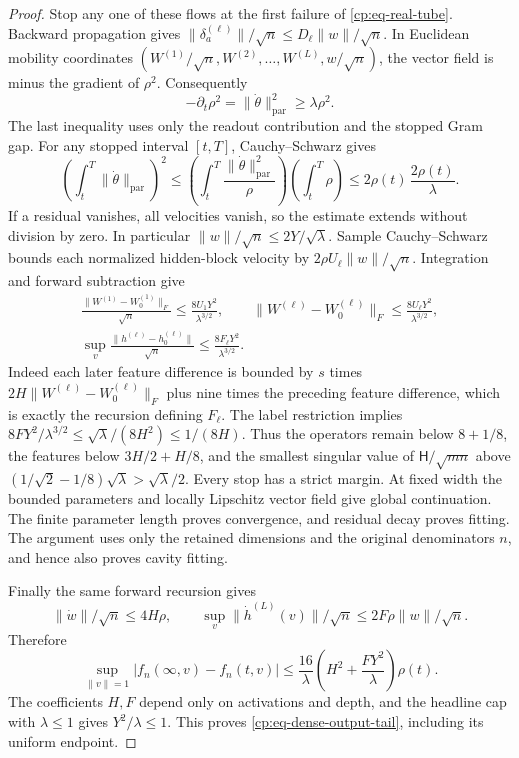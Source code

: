 \begin{proof}
Stop any one of these flows at the first failure of
\eqref{cp:eq-real-tube}.  Backward propagation gives
$\|\delta_a^{(\ell)}\|/\sqrt n\le D_\ell\|w\|/\sqrt n$.
In Euclidean mobility coordinates
$(W^{(1)}/\sqrt n,W^{(2)},\ldots,W^{(L)},w/\sqrt n)$,
the vector field is minus the gradient of $\rho^2$.  Consequently
\[
 -\partial_t\rho^2=\|\dot\theta\|_{\mathrm{par}}^2
 \ge\lambda\rho^2.
\]
The last inequality uses only the readout contribution and the stopped
Gram gap.  For any stopped interval $[t,T]$, Cauchy--Schwarz gives
\[
 \left(\int_t^T\|\dot\theta\|_{\mathrm{par}}\right)^2
 \le\left(\int_t^T\frac{\|\dot\theta\|_{\mathrm{par}}^2}{\rho}\right)
      \left(\int_t^T\rho\right)
 \le2\rho(t)\,\frac{2\rho(t)}\lambda.
\]
If a residual vanishes, all velocities vanish, so the estimate extends
without division by zero.  In particular $\|w\|/\sqrt n\le2Y/\sqrt\lambda$.
Sample Cauchy--Schwarz bounds each normalized hidden-block velocity by
$2\rho U_\ell\|w\|/\sqrt n$.  Integration and forward subtraction give
\begin{gather}
 \frac{\|W^{(1)}-W_0^{(1)}\|_F}{\sqrt n}
       \le\frac{8U_1Y^2}{\lambda^{3/2}},\qquad
 \|W^{(\ell)}-W_0^{(\ell)}\|_F
       \le\frac{8U_\ell Y^2}{\lambda^{3/2}},\nonumber\\
 \sup_v\frac{\|h^{(\ell)}-h_0^{(\ell)}\|}{\sqrt n}
       \le\frac{8F_\ell Y^2}{\lambda^{3/2}}.
 \label{cp:eq-dense-displacements}
\end{gather}
Indeed each later feature difference is bounded by $s$ times
$2H\|W^{(\ell)}-W_0^{(\ell)}\|_F$ plus nine times the preceding
feature difference, which is exactly the recursion defining $F_\ell$.
The label restriction implies
$8FY^2/\lambda^{3/2}\le\sqrt\lambda/(8H^2)\le1/(8H)$.
Thus the operators remain below $8+1/8$, the features below
$3H/2+H/8$, and the smallest singular value of
$\mathsf H/\sqrt{mn}$ above
$(1/\sqrt2-1/8)\sqrt\lambda>\sqrt\lambda/2$.
Every stop has a strict margin.  At fixed width the bounded parameters
and locally Lipschitz vector field give global continuation.  The
finite parameter length proves convergence, and residual decay proves
fitting.  The argument uses only the retained dimensions and the
original denominators $n$, and hence also proves cavity fitting.

Finally the same forward recursion gives
\[
 \|\dot w\|/\sqrt n\le4H\rho,\qquad
 \sup_v\|\dot h^{(L)}(v)\|/\sqrt n\le2F\rho\|w\|/\sqrt n.
\]
Therefore
\[
 \sup_{\|v\|=1}|f_n(\infty,v)-f_n(t,v)|
 \le\frac{16}{\lambda}
       \left(H^2+\frac{FY^2}{\lambda}\right)\rho(t).
\]
The coefficients $H,F$ depend only on activations and depth, and the
headline cap with $\lambda\le1$ gives $Y^2/\lambda\le1$.
This proves \eqref{cp:eq-dense-output-tail}, including its uniform endpoint.
\end{proof}

